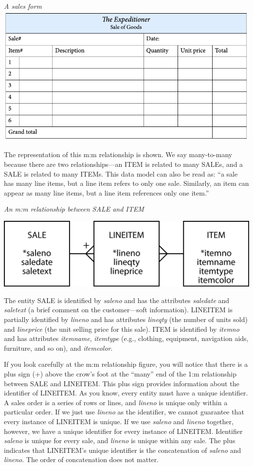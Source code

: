 \documentclass[
]{article}
\begin{document}
\emph{A sales form} \includegraphics{Figures/Chapter 5/sales form.png}

The representation of this m:m relationship is shown. We say many-to-many because there are two relationships---an ITEM is related to many SALEs, and a SALE is related to many ITEMs. This data model can also be read as: ``a sale has many line items, but a line item refers to only one sale. Similarly, an item can appear as many line items, but a line item references only one item.''

\emph{An m:m relationship between SALE and ITEM}

\includegraphics[width=5.89583in,height=\textheight]{Figures/Chapter 5/sale-item.png}

The entity SALE is identified by \emph{saleno} and has the attributes \emph{saledate} and \emph{saletext} (a brief comment on the customer---soft information). LINEITEM is partially identified by \emph{lineno} and has attributes \emph{lineqty} (the number of units sold) and \emph{lineprice} (the unit selling price for this sale). ITEM is identified by \emph{itemno} and has attributes \emph{itemname}, \emph{itemtype} (e.g., clothing, equipment, navigation aids, furniture, and so on), and \emph{itemcolor}.

If you look carefully at the m:m relationship figure, you will notice that there is a plus sign (+) above the crow's foot at the ``many'' end of the 1:m relationship between SALE and LINEITEM. This plus sign provides information about the identifier of LINEITEM. As you know, every entity must have a unique identifier. A sales order is a series of rows or lines, and \emph{lineno} is unique only within a particular order. If we just use \emph{lineno} as the identifier, we cannot guarantee that every instance of LINEITEM is unique. If we use \emph{saleno} and \emph{lineno} together, however, we have a unique identifier for every instance of LINEITEM. Identifier \emph{saleno} is unique for every sale, and \emph{lineno} is unique within any sale. The plus indicates that LINEITEM's unique identifier is the concatenation of \emph{saleno} and \emph{lineno}. The order of concatenation does not matter.
\end{document}

